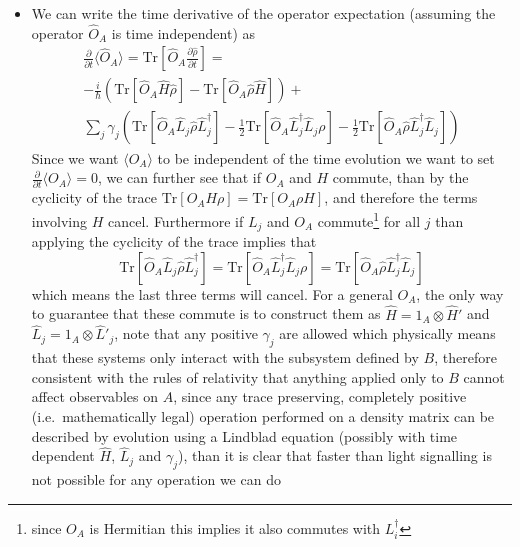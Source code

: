 \documentclass[english]{article}
\newcommand{\average}[1]{\langle #1 \rangle}
\begin{document}
\begin{enumerate}
\begin{itemize}
\begin{align}
\average{\hat{O}_A}=\sum_j\mathrm{Tr}[  \hat{O}_A\hat{\rho} \hat{\Pi}_{B,j}]=\mathrm{Tr}[ \sum_j \hat{O}_A\hat{\rho} \hat{\Pi}_{B,j}]=\nonumber \\ \mathrm{Tr}[  \hat{O}_A\hat{\rho} (\sum_j \hat{\Pi}_{B,j})]=\mathrm{Tr}[  \hat{O}_A\hat{\rho} 1]=\mathrm{Tr}[  \hat{O}_A\hat{\rho}]
\end{align}
 this implies that the result again cannot be affected, taking a measurement without communicating the outcome cannot make an observable difference, and therefore relativity is safe
\item We can write the time derivative of the operator expectation (assuming the operator $\hat{O}_A$ is time independent) as
\begin{align}
\frac{\partial}{\partial t}\average{\hat{O}_A}=\mathrm{Tr}\left[\hat{O}_A\frac{\partial \hat{\rho}}{\partial t}\right]=\nonumber \\
-\frac{i}{\hbar}(\mathrm{Tr}\left[\hat{O}_A \hat{H}\hat{\rho}\right]-\mathrm{Tr}\left[\hat{O}_A \hat{\rho} \hat{H}\right])+\nonumber \\ 
\sum_j\gamma_j\left(\mathrm{Tr}\left[\hat{O}_A\hat{L}_j\hat{\rho} \hat{L}^\dagger_j\right]-\frac{1}{2}\mathrm{Tr}\left[\hat{O}_A\hat{L}^\dagger_j \hat{L}_j\rho\right]-\frac{1}{2}\mathrm{Tr}\left[\hat{O}_A\hat{\rho} \hat{L}^\dagger_j\hat{L}_j\right]\right)
\end{align}
Since we want $\average{O_A}$ to be independent of the time evolution we want to set $\frac{\partial}{\partial t}\average{O_A}=0$, we can further see that if $O_A$ and $H$ commute, than by the cyclicity of the trace  $\mathrm{Tr}\left[O_A H\rho\right]=\mathrm{Tr}\left[O_A \rho H\right]$, and therefore the terms involving $H$ cancel. Furthermore if $L_j$ and $O_A$ commute\footnote{since $O_A$ is Hermitian this implies it also commutes with $L^\dagger_i$} for all $j$ than applying the cyclicity of the trace implies that 
\begin{equation}
\mathrm{Tr}\left[\hat{O}_A\hat{L}_j\hat{\rho} \hat{L}^\dagger_j\right]=\mathrm{Tr}\left[\hat{O}_A\hat{L}^\dagger_j \hat{L}_j\rho\right]=\mathrm{Tr}\left[\hat{O}_A\hat{\rho} \hat{L}^\dagger_j\hat{L}_j\right]
\end{equation}
which means the last three terms will cancel. For a general $O_A$, the only way to guarantee that these commute is to construct them as $\hat{H}=1_A \otimes \hat{H}'$ and $\hat{L}_j=1_A \otimes \hat{L}'_j$, note that any positive $\gamma_j$ are allowed which physically means that these systems only interact with the subsystem defined by $B$, therefore consistent with the rules of relativity that anything applied only to $B$ cannot affect observables on $A$, since any trace preserving, completely positive (i.e.~mathematically legal) operation performed on a density matrix can be described by evolution using a Lindblad equation (possibly with time dependent $\hat{H}$, $\hat{L}_j$ and $\gamma_j$), than it is clear that faster than light signalling is not possible for any operation we can do

\end{itemize}
\end{enumerate}
\end{document}
